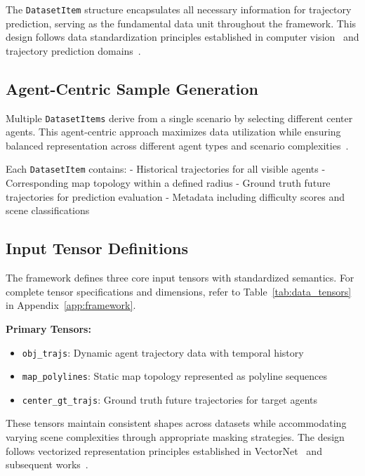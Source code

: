 The \texttt{DatasetItem} structure encapsulates all necessary information for trajectory prediction, serving as the fundamental data unit throughout the framework. This design follows data standardization principles established in computer vision~\cite{DETR2020} and trajectory prediction domains~\cite{unitrajFeng2024}.

\subsection{Agent-Centric Sample Generation}
\label{ssec:sample_generation}

Multiple \texttt{DatasetItems} derive from a single scenario by selecting different center agents. This agent-centric approach maximizes data utilization while ensuring balanced representation across different agent types and scenario complexities~\cite{cui2019multimodal}.

Each \texttt{DatasetItem} contains:
- Historical trajectories for all visible agents
- Corresponding map topology within a defined radius
- Ground truth future trajectories for prediction evaluation
- Metadata including difficulty scores and scene classifications

\subsection{Input Tensor Definitions}
\label{ssec:tensor_definitions}

The framework defines three core input tensors with standardized semantics. For complete tensor specifications and dimensions, refer to Table~\ref{tab:data_tensors} in Appendix~\ref{app:framework}.

\textbf{Primary Tensors:}
\begin{itemize}
    \item \texttt{obj\_trajs}: Dynamic agent trajectory data with temporal history
    \item \texttt{map\_polylines}: Static map topology represented as polyline sequences
    \item \texttt{center\_gt\_trajs}: Ground truth future trajectories for target agents
\end{itemize}

These tensors maintain consistent shapes across datasets while accommodating varying scene complexities through appropriate masking strategies. The design follows vectorized representation principles established in VectorNet~\cite{gao2020vectornet} and subsequent works~\cite{liang2020learning}.

